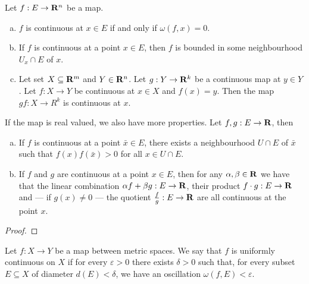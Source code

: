 \begin{proposition}
    Let \(f: E \to \mathbf{R}^n\) be a map.
    \begin{enumerate}[(a)]
        \item \(f\) is continuous at \(x \in E\) if and only if \(\omega(f, x) =
              0\).
        \item If \(f\) is continuous at a point \(x \in E\), then \(f\) is bounded
              in some neighbourhood \(U_x \cap E\) of \(x\).
        \item Let set \(X \subseteq \mathbf{R}^m\) and \(Y \in \mathbf{R}^n\). Let \(g: Y \to \mathbf{R}^k\)
              be a continuous map at \(y \in Y\). Let \(f: X \to Y\) be continuous at
              \(x \in X\) and \(f(x) = y\). Then the map \(g  f: X \to R^k\) is
              continuous at \(x\).
    \end{enumerate}
    If the map is real valued, we also have more properties. Let \(f, g: E \to
    \mathbf{R}\), then
    \begin{enumerate}[(a)]
        \item If \(f\) is continuous at a point \(\bar x \in E\), there exists a
              neighbourhood \(U \cap E\) of \(\bar x\) such that \(f(x)f(\bar x) > 0\)
              for all \(x \in U \cap E\).
        \item If \(f\) and \(g\) are continuous at a point \(x \in E\), then for any
              \(\alpha, \beta \in \mathbf{R}\) we have that the linear combination \(\alpha f +
              \beta g: E \to \mathbf{R}\), their product \(f \cdot g: E \to \mathbf{R}\) and --- if \(g(x)
              \neq 0\) --- the quotient \(\frac f g: E \to \mathbf{R}\) are all continuous at
              the point \(x\).
    \end{enumerate}
\end{proposition}

\begin{proof}
\end{proof}

\begin{definition}\label{def:uniformly-continuous}
    Let \(f: X \to Y\) be a map between metric spaces. We say that \(f\) is
    uniformly continuous on \(X\) if for every \(\varepsilon > 0\) there exists
    \(\delta > 0\) such that, for every subset \(E \subseteq X\) of diameter \(d(E)
    < \delta\), we have an oscillation \(\omega(f, E) < \varepsilon\).
\end{definition}

